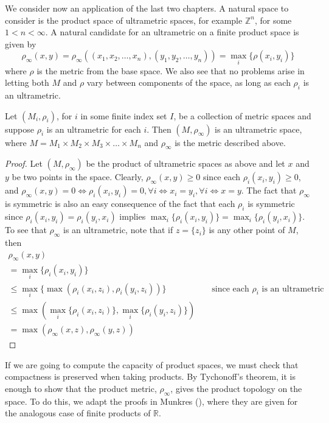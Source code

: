 We consider now an application of the last two chapters. A natural space to consider is the product space of ultrametric spaces, for example $\mathbb{Z}^n$, for some $1 < n < \infty$. A natural candidate for an ultrametric on a finite product space is given by
\[ \rho_\infty(x,y) = \rho_\infty((x_1,x_2,\ldots,x_n),(y_1,y_2, \ldots, y_n)) = \max_{i} \{\rho(x_i, y_i)\}\] where $\rho$ is the metric from the base space.  We also see that no problems arise in letting both $M$ and $\rho$ vary between components of the space, as long as each $\rho_i$ is an ultrametric.

\begin{proposition}
Let $(M_i, \rho_i)$, for $i$ in some finite index set $I$, be a collection of metric spaces and suppose $\rho_i$ is an ultrametric for each $i$. Then $(M,\rho_\infty)$ is an ultrametric space, where $M=M_1 \times M_2 \times M_3 \times \ldots \times M_n$ and $\rho_\infty$ is the metric described above.
\end{proposition}

\begin{proof}
Let $(M, \rho_\infty)$ be the product of ultrametric spaces as above and let $x$ and $y$ be two points in the space. Clearly, $\rho_\infty(x,y) \geq 0$ since each $\rho_i(x_i,y_i) \geq 0$, and $\rho_\infty(x,y) = 0 \iff \rho_i(x_i,y_i) =0,\forall i \iff x_i=y_i, \forall i \iff x=y$. The fact that $\rho_\infty$ is symmetric is also an easy consequence of the fact that each $\rho_i$ is symmetric since  $\rho_i(x_i, y_i) = \rho_i(y_i, x_i)$ implies $\max_{i}\{\rho_i(x_i, y_i)\} = \max_i\{\rho_i(y_i, x_i)\}$. To see that $\rho_\infty$ is an ultrametric, note that if $z=\{z_i\}$ is any other point of $M$, then
\begin{align*}
    \rho_\infty(x, y) &&\\
     = \max_i\{\rho_i(x_i,y_i)\} && \\
    \leq \max_i\{\max(\rho_i(x_i,z_i),\rho_i(y_i,z_i))\} && \text{ since each $\rho_i$ is an ultrametric } \\
    \leq \max(\max_i\{\rho_i(x_i,z_i)\}, \max_i\{\rho_i(y_i,z_i)\})  \\
    = \max(\rho_\infty(x,z),\rho_\infty(y,z))  
\end{align*}
\end{proof}

If we are going to compute the capacity of product spaces, we must check that compactness is preserved when taking products. By Tychonoff's theorem, it is enough to show that the product metric, $\rho_\infty$, gives the product topology on the space. To do this, we adapt the proofs in Munkres (\cite{mun}), where they are given for the analogous case of finite products of $\mathbb{R}$.\\

